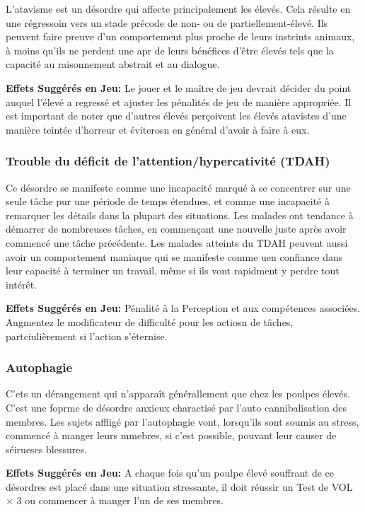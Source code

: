 L'atavisme est un désordre qui affecte principalement les élevés. Cela résulte en une régressoin vers un stade précode de non- ou de partiellement-élevé. Ils peuvent faire preuve d'un comportement plus proche de leurs instcints animaux, à moins qu'ils ne perdent une apr de leurs bénéfices d'être élevés tels que la capacité au raisonnement abstrait et au dialogue. 

\textbf{Effets Suggérés en Jeu:} Le jouer et le maître de jeu devrait décider du point auquel l'élevé a regressé et ajuster les pénalités de jeu de manière appropriée. Il est important de noter que d'autres élevés perçoivent les élevés atavistes d'une manière teintée d'horreur et éviterosn en général d'avoir à faire à eux. 

\subsubsection{Trouble du déficit de l'attention/hypercativité (TDAH)} 

Ce désordre se manifeste comme une incapacité marqué à se concentrer sur une seule tâche pur une période de temps étendues, et comme une incapacité à remarquer les détails dans la plupart des situations. Les malades ont tendance à démarrer de nombreuses tâches, en commençant une nouvelle juste après avoir commencé une tâche précédente. Les malades atteints du TDAH peuvent aussi avoir un comportement maniaque qui se manifeste comme uen confiance dans leur capacité à terminer un travail, même si ils vont rapidment y perdre tout intérêt. 

\textbf{Effets Suggérés en Jeu:} Pénalité à la Perception et aux compétences associées. Augmentez le modificateur de difficulté pour les actiosn de tâches, partciulièrement si l'action s'éternise. 

\subsubsection{Autophagie} 

C'ets un dérangement qui n'apparaît générallement que chez les poulpes élevés. C'est une foprme de désordre anxieux charactisé par l'auto cannibalisation des membres. Les sujets affligé par l'autophagie vont, lorsqu'ils sont soumis au stress, commencé à manger leurs mmebres, si c'est possible, pouvant leur causer de séirueses blessures. 

\textbf{Effets Suggérés en Jeu:} A chaque fois qu'un poulpe élevé souffrant de ce désordres est placé dans une situation stressante, il doit réussir un Test de VOL $\times$ 3 ou commencer à manger l'un de ses membres. 

